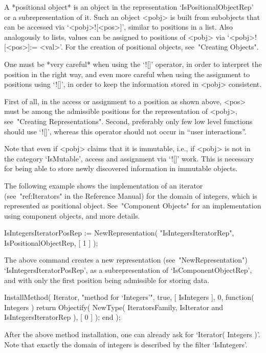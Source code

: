 A *positional object* is an object in the representation
`IsPositionalObjectRep' or a subrepresentation of it.
Such an object <pobj> is built from subobjects that can be accessed via
`<pobj>![<pos>]', similar to positions in a list.
Also analogously to lists, values can be assigned to positions of
<pobj> via `<pobj>![<pos>]:= <val>'.
For the creation of positional objects, see~"Creating Objects".

One must be *very careful* when using the `![]' operator,
in order to interpret the position in the right way,
and even more careful when using the assignment to positions using `![]',
in order to keep the information stored in <pobj> consistent.

First of all, in the access or assignment to a position as shown above,
<pos> must be among the admissible positions
for the representation of <pobj>, see~"Creating Representations".
Second, preferably only few low level functions should use `![]',
whereas this operator should not occur in ``user interactions''.

Note that even if <pobj> claims that it is immutable, i.e., if <pobj>
is not in the category `IsMutable', access and assignment via `![]' work.
This is necessary for being able to store newly discovered information
in immutable objects.

The following example shows the implementation of an iterator
(see~"ref:Iterators" in the Reference Manual) for the domain of integers,
which is represented as positional object.
See~"Component Objects" for an implementation using component objects,
and more details.

\begintt
IsIntegersIteratorPosRep := NewRepresentation( "IsIntegersIteratorRep",
    IsPositionalObjectRep, [ 1 ] );
\endtt

The above command creates a new representation (see~"NewRepresentation")
`IsIntegersIteratorPosRep',
as a subrepresentation of `IsComponentObjectRep',
and with only the first position being admissible for storing data.

\begintt
InstallMethod( Iterator,
    "method for `Integers'",
    true,
    [ IsIntegers ], 0,
    function( Integers )
    return Objectify( NewType( IteratorsFamily,
                                   IsIterator
                               and IsIntegersIteratorRep ),
                      [ 0 ] );
    end );
\endtt

After the above method installation, one can already ask for
`Iterator( Integers )'.
Note that exactly the domain of integers is described by
the filter `IsIntegers'.

